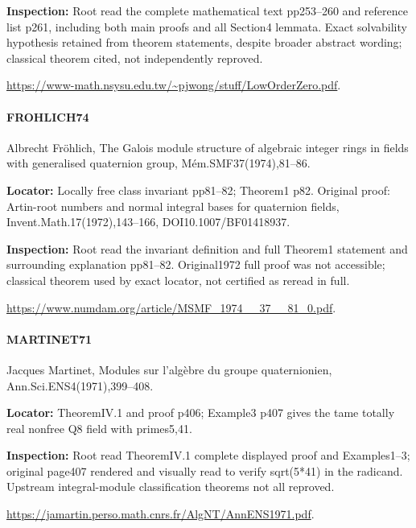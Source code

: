 \documentclass[11pt,a4paper]{article}
\begin{document}
\textbf{Inspection:} Root read the complete mathematical text pp253–\allowbreak{}260 and reference list p261, including both main proofs and all Section4 lemmata.\allowbreak{} Exact solvability hypothesis retained from theorem statements, despite broader abstract wording; classical theorem cited, not independently reproved.\allowbreak{}

\url{https://www-math.nsysu.edu.tw/~pjwong/stuff/LowOrderZero.pdf}.

\paragraph{FROHLICH74} Albrecht Fröhlich, The Galois module structure of algebraic integer rings in fields with generalised quaternion group, Mém.\allowbreak{}SMF37(1974),81–\allowbreak{}86.

\textbf{Locator:} Locally free class invariant pp81–\allowbreak{}82; Theorem1 p82.\allowbreak{} Original proof:\allowbreak{} Artin-root numbers and normal integral bases for quaternion fields, Invent.\allowbreak{}Math.\allowbreak{}17(1972),143–\allowbreak{}166, DOI10.\allowbreak{}1007/\allowbreak{}BF01418937.

\textbf{Inspection:} Root read the invariant definition and full Theorem1 statement and surrounding explanation pp81–\allowbreak{}82.\allowbreak{} Original1972 full proof was not accessible; classical theorem used by exact locator, not certified as reread in full.\allowbreak{}

\url{https://www.numdam.org/article/MSMF_1974__37__81_0.pdf}.

\paragraph{MARTINET71} Jacques Martinet, Modules sur l’algèbre du groupe quaternionien, Ann.\allowbreak{}Sci.\allowbreak{}ENS4(1971),399–\allowbreak{}408.

\textbf{Locator:} TheoremIV.\allowbreak{}1 and proof p406; Example3 p407 gives the tame totally real nonfree Q8 field with primes5,41.

\textbf{Inspection:} Root read TheoremIV.\allowbreak{}1 complete displayed proof and Examples1–\allowbreak{}3; original page407 rendered and visually read to verify sqrt(5*41) in the radicand.\allowbreak{} Upstream integral-module classification theorems not all reproved.\allowbreak{}

\url{https://jamartin.perso.math.cnrs.fr/AlgNT/AnnENS1971.pdf}.
\end{document}
